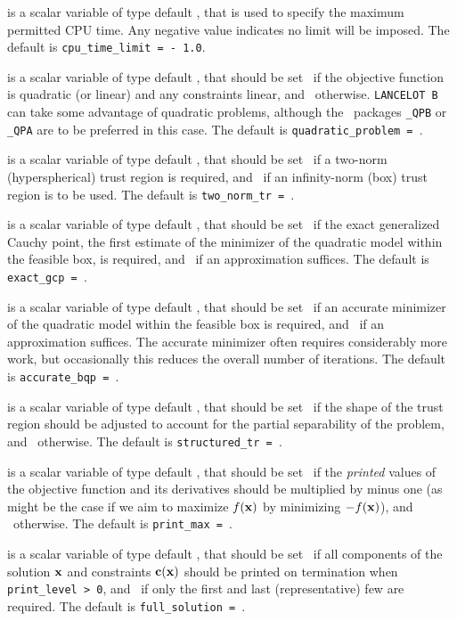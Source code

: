 \documentclass{galahad}
\newcommand{\packagename}{LANCELOT B}
\begin{document}
\begin{description}
 is a scalar variable of type default \realdp,
that is used to specify the maximum permitted CPU time. Any negative
value indicates no limit will be imposed. The default is
{\tt cpu\_time\_limit = - 1.0}.

 is a scalar variable of type default \logical, that
should be set \true\ if the objective function is quadratic (or linear)
and any constraints linear, and \false\ otherwise. {\tt \packagename} can
take some advantage of quadratic problems, although the \galahad\ packages
{\tt \libraryname\_QPB} or {\tt \libraryname\_QPA} are to be preferred
in this case.
The default is {\tt quadratic\_problem = \false}.

 is a scalar variable of type default \logical, that should
be set \true\ if a two-norm (hyperspherical) trust region is
required, and \false\ if an infinity-norm (box)
trust region is to be used.
The default is {\tt two\_norm\_tr = \false}.

 is a scalar variable of type default \logical, that should
be set \true\ if the exact generalized Cauchy point,
the first estimate of the minimizer of the quadratic model within
the feasible box, is required, and \false\ if an approximation suffices.
The default is {\tt exact\_gcp = \true}.

 is a scalar variable of type default \logical, that should
be set \true\ if an accurate minimizer of the
quadratic model within the feasible box is required, and
\false\ if an approximation suffices. The accurate minimizer often
requires considerably more work, but occasionally this reduces the overall
number of iterations.
The default is {\tt accurate\_bqp = \false}.

 is a scalar variable of type default \logical, that should
be set \true\ if the shape of the trust region should be adjusted to
account for the partial separability of the problem,
and \false\ otherwise.
The default is {\tt structured\_tr = \false}.

 is a scalar variable of type default \logical, that should
be set \true\ if the {\em printed} values of the objective function and its
derivatives should be multiplied by minus one (as might be the case if
we aim to maximize $f({\mathbf{x}})$ by minimizing $-f({\mathbf{x}})$), and \false\ otherwise.
The default is {\tt print\_max = \false}.

 is a scalar variable of type default \logical, that should
be set \true\ if all components of the solution ${\mathbf{x}}$ and constraints
${\mathbf{c}}({\mathbf{x}})$ should be printed on termination when {\tt print\_level > 0},
and \false\ if only the first and last (representative) few are required.
The default is {\tt full\_solution = \true}.


\end{description}
\end{document}
